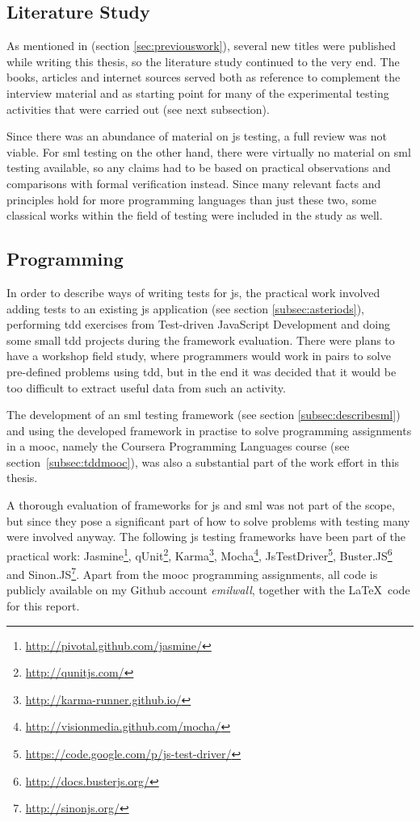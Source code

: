 \documentclass[11pt]{article}
\begin{document}
\subsection{Literature Study}

As mentioned in  (section \ref{sec:previouswork}), several new titles were published while writing this thesis, so the literature study continued to the very end. The books, articles and internet sources served both as reference to complement the interview material and as starting point for many of the experimental testing activities that were carried out (see next subsection).

Since there was an abundance of material on \gls{js} testing, a full review was not viable. For \gls{sml} testing on the other hand, there were virtually no material on \gls{sml} testing available, so any claims had to be based on practical observations and comparisons with formal verification instead. Since many relevant facts and principles hold for more programming languages than just these two, some classical works within the field of testing were included in the study as well.

\subsection{Programming}
\label{subsec:programming}

In order to describe ways of writing tests for \gls{js}, the practical work involved adding tests to an existing \gls{js} application (see section \ref{subsec:asteriods}), performing \gls{tdd} exercises from Test-driven JavaScript Development \cite[part~III]{Tddjs} and doing some small \gls{tdd} projects during the framework evaluation. There were plans to have a workshop field study, where programmers would work in pairs to solve pre-defined problems using \gls{tdd}, but in the end it was decided that it would be too difficult to extract useful data from such an activity.

The development of an \gls{sml} testing framework (see section \ref{subsec:describesml}) and using the developed framework in practise to solve programming assignments in a \gls{mooc}, namely the Coursera Programming Languages course (see section~\ref{subsec:tddmooc}), was also a substantial part of the work effort in this thesis.

A thorough evaluation of frameworks for \gls{js} and \gls{sml} was not part of the scope, but since they pose a significant part of how to solve problems with testing many were involved anyway. The following \gls{js} testing frameworks have been part of the practical work:
Jasmine\footnote{\url{http://pivotal.github.com/jasmine/}},
qUnit\footnote{\url{http://qunitjs.com/}},
Karma\footnote{\url{http://karma-runner.github.io/}},
Mocha\footnote{\url{http://visionmedia.github.com/mocha/}},
JsTestDriver\footnote{\url{https://code.google.com/p/js-test-driver/}},
Buster.JS\footnote{\url{http://docs.busterjs.org/}} and
Sinon.JS\footnote{\url{http://sinonjs.org/}}. Apart from the \gls{mooc} programming assignments, all code is publicly available on my Github account \emph{emilwall}, together with the \LaTeX~code for this report.
\end{document}
